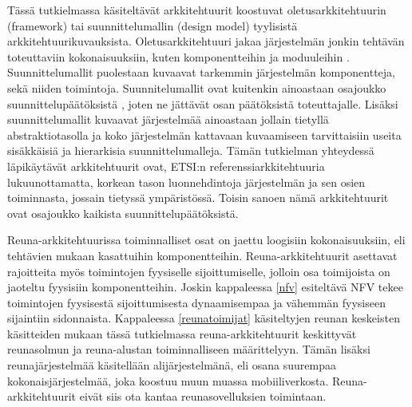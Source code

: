 Tässä tutkielmassa käsiteltävät arkkitehtuurit koostuvat oletusarkkitehtuurin (framework) tai suunnittelumallin (design model) tyylisistä arkkitehtuurikuvauksista. 
Oletusarkkitehtuuri jakaa järjestelmän jonkin tehtävän toteuttaviin kokonaisuuksiin, kuten komponentteihin ja moduuleihin \cite{ohark}. 
Suunnittelumallit puolestaan kuvaavat tarkemmin järjestelmän komponentteja, sekä niiden toimintoja. Suunnitelumallit ovat kuitenkin ainoastaan osajoukko suunnittelupäätöksistä \cite{ohark2}, joten ne jättävät osan päätöksistä toteuttajalle. Lisäksi suunnittelumallit kuvaavat järjestelmää ainoastaan jollain tietyllä abstraktiotasolla ja koko järjestelmän kattavaan kuvaamiseen tarvittaisiin useita sisäkkäisiä ja hierarkisia suunnittelumalleja. Tämän tutkielman yhteydessä läpikäytävät arkkitehtuurit ovat, ETSI:n referenssiarkkitehtuuria \cite{etsirefarch} lukuunottamatta, korkean tason luonnehdintoja järjestelmän ja sen osien toiminnasta, jossain tietyssä ympäristössä. Toisin sanoen nämä arkkitehtuurit ovat osajoukko kaikista suunnittelupäätöksistä.
 
Reuna-arkkitehtuurissa toiminnalliset osat on jaettu loogisiin kokonaisuuksiin, eli tehtävien mukaan kasattuihin komponentteihin. Reuna-arkkitehtuurit asettavat rajoitteita myös toimintojen fyysiselle sijoittumiselle, jolloin osa toimijoista on jaoteltu fyysisiin komponentteihin. Joskin kappaleessa \ref{nfv} esiteltävä NFV tekee toimintojen fyysisestä sijoittumisesta dynaamisempaa ja vähemmän fyysiseen sijaintiin sidonnaista. 
Kappaleessa \ref{reunatoimijat} käsiteltyjen reunan keskeisten käsitteiden mukaan tässä tutkielmassa reuna-arkkitehtuurit keskittyvät reunasolmun ja reuna-alustan toiminnalliseen määrittelyyn. 
Tämän lisäksi reunajärjestelmää käsitellään alijärjestelmänä, eli osana suurempaa kokonaisjärjestelmää, joka koostuu muun muassa mobiiliverkosta.
Reuna-arkkitehtuurit eivät siis ota kantaa reunasovelluksien toimintaan.



